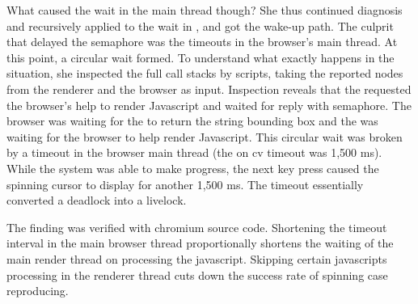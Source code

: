 What caused the wait in the  main thread though? She thus continued
diagnosis and recursively applied \xxx to the wait in , and got
the wake-up path. The culprit that delayed the semaphore was the timeouts in
the browser's main thread. At this point, a circular wait formed. To understand
what exactly happens in the situation, she inspected the full call stacks by
\xxx scripts, taking the reported nodes from the renderer and the browser as
input. Inspection reveals that the  requested the browser's help to
render Javascript and waited for reply with semaphore. The browser was waiting
for the  to return the string bounding box and the 
was waiting for the browser to help render Javascript. This circular wait was
broken by a timeout in the browser main thread (the  on cv timeout was
1,500 ms). While the system was able to make progress, the next key press caused
the spinning cursor to display for another 1,500 ms. The timeout essentially
converted a deadlock into a livelock.

The finding was verified with chromium source code. Shortening the timeout interval
in the main browser thread proportionally shortens the waiting of the main
render thread on processing the javascript. Skipping certain javascripts
processing in the renderer thread cuts down the success rate of spinning case
reproducing.

